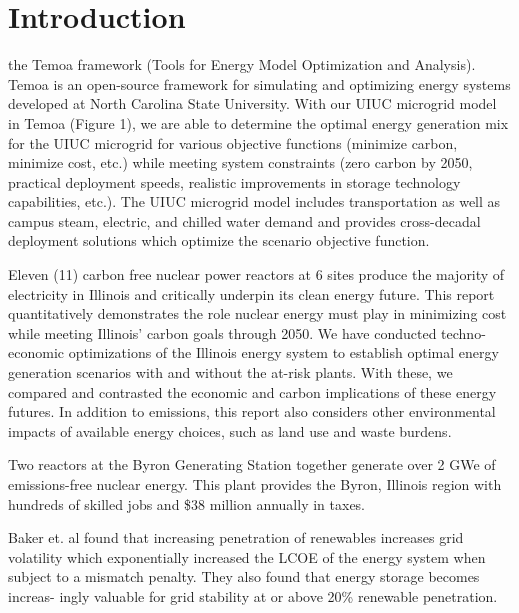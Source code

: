 \section{Introduction}
the Temoa framework (Tools for Energy 
Model Optimization and Analysis)\cite{temoa}. Temoa is an open-source framework for 
simulating and optimizing energy systems developed at North Carolina State 
University. With our \gls{UIUC} microgrid model in 
Temoa (Figure 1), we are able to determine the optimal energy generation mix 
for the \gls{UIUC} microgrid for various objective functions (minimize carbon, 
minimize cost, etc.) while meeting system constraints (zero carbon by 2050, 
practical deployment speeds, realistic improvements in storage technology 
capabilities, etc.). The UIUC microgrid model includes transportation as well 
as campus steam, electric, and chilled water demand and provides cross-decadal 
deployment solutions which optimize the scenario objective function.



Eleven (11) carbon free nuclear power reactors at 6 sites produce the majority of
electricity in Illinois and critically underpin its clean energy future. This
report quantitatively demonstrates the role nuclear energy must play in
minimizing cost while meeting Illinois’ carbon goals
through 2050. We have conducted techno-economic optimizations of
the Illinois energy system to establish optimal energy generation scenarios with and without the
at-risk plants. With these, we compared and contrasted the economic and carbon implications of
these energy futures. In addition to emissions, this report also considers
other environmental impacts of available energy choices, such as land use and
waste burdens.

Two reactors at the Byron Generating Station together generate over 2 GWe of
emissions-free nuclear energy. This plant provides the Byron, Illinois region
with hundreds of skilled jobs and \$38 million annually in taxes.


Baker et. al found that increasing penetration of renewables increases grid 
volatility which exponentially increased the \gls{LCOE} of the energy system when 
subject to a mismatch penalty. They also found that energy storage becomes 
increas- ingly valuable for grid stability at or above 20\% renewable 
penetration.


